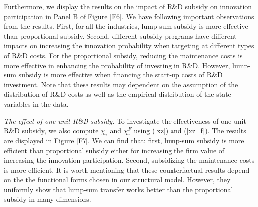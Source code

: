 \documentclass[11pt]{article}
\begin{document}
Furthermore, we display the results on the impact of R\&D subsidy on innovation participation in Panel B of Figure \ref{F6}. We have following important observations from the results. First, for all the industries, lump-sum subsidy is more effective than proportional subsidy. Second, different subsidy programs have different impacts on increasing the innovation probability when targeting at different types of R\&D costs. For the proportional subsidy, reducing the maintenance costs is more effective in enhancing the probability of investing in R\&D. However, lump-sum subsidy is more effective when financing the start-up costs of R\&D investment. Note that these results may dependent on the assumption of the distribution of R\&D costs as well as the empirical distribution of the state variables in the data. 

\textit{The effect of one unit R\&D subsidy.} To investigate the effectiveness of one unit R\&D subsidy, we also compute $\chi_\tau$ and $\chi_\tau^F$ using (\ref{xz}) and (\ref{xz_f}). The results are displayed in Figure \ref{F7}. We can find that: first, lump-sum subsidy is more efficient than proportional subsidy either for increasing the firm value of increasing the innovation participation. Second, subsidizing the maintenance costs is more efficient. It is worth mentioning that these counterfactual results depend on the the functional forms chosen in our structural model. However, they uniformly show that lump-sum transfer works better than the proportional subsidy in many dimensions.
\end{document}
